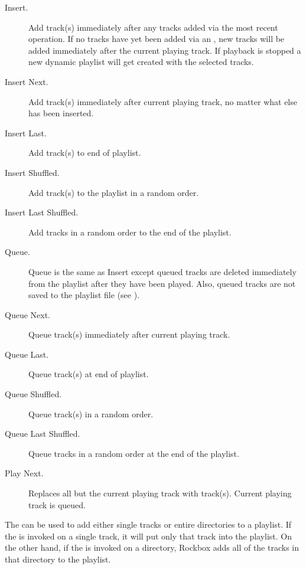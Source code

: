 \begin{description} 
\item [Insert.] Add track(s) immediately after any tracks added via the most
  recent  operation. If no tracks have yet been added via an
  , new tracks will be added immediately after the current
  playing track. If playback is stopped a new dynamic playlist will get
  created with the selected tracks.
  
\item [Insert Next.] Add track(s) immediately after current playing
  track, no matter what else has been inserted.
  
\item [Insert Last.] Add track(s) to end of playlist.

\item [Insert Shuffled.] Add track(s) to the playlist in a random order.

\item [Insert Last Shuffled.] Add tracks in a random order to the end of the playlist.

\item [Queue.] Queue is the same as Insert except queued tracks are
  deleted immediately from the playlist after they have been played. Also,
  queued tracks are not saved to the playlist file (see
  ).
  
\item [Queue Next.] Queue track(s) immediately after current playing track.
  
\item [Queue Last.] Queue track(s) at end of playlist.

\item [Queue Shuffled.] Queue track(s) in a random order.

\item [Queue Last Shuffled.] Queue tracks in a random order at the end of the playlist.

\item [Play Next.] Replaces all but the current playing track with track(s).
    Current playing track is queued.
\end{description}

The   can be used to add either single tracks or
entire directories to a playlist. If the  is
invoked on a single track, it will put only that track into the playlist.
On the other hand, if the  is invoked on a
directory, Rockbox adds all of the tracks in that directory to the
playlist.

